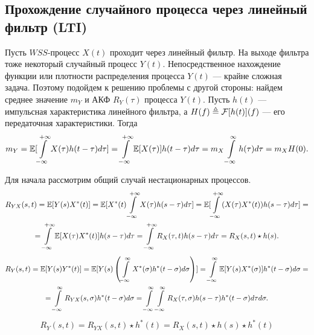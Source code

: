 \documentclass{book}
\numberwithin{theorem}{chapter}
\numberwithin{statement}{chapter}
\numberwithin{lemma}{chapter}
\theoremstyle{definition}
\numberwithin{task}{chapter}
\theoremstyle{remark}
\numberwithin{example}{chapter}
\theoremstyle{definition}
\numberwithin{definition}{chapter}
\theoremstyle{remark}
\theoremstyle{remark}
\numberwithin{lyrics}{section}
\begin{document}
\subsection{Прохождение случайного процесса через линейный фильтр (LTI)}
Пусть $WSS$-процесс $X(t)$ проходит через линейный фильтр. На выходе фильтра тоже некоторый случайный процесс $Y(t)$. Непосредственное нахождение функции или плотности распределения процесса $Y(t)$ --- крайне сложная задача. Поэтому подойдем к решению проблемы с другой стороны: найдем среднее значение $m_Y$ и АКФ $R_Y(\tau)$ процесса $Y(t)$. Пусть $h(t)$ --- импульсная характеристика линейного фильтра, а $H(f) \triangleq \mathcal{F}[h(t)](f)$ --- его передаточная характеристики. Тогда 
\begin{gather}
m_Y = \mathbb{E}[\int\limits_{-\infty}^{+\infty} X(\tau) h(t - \tau) d\tau] = \int\limits_{-\infty}^{+\infty} \mathbb{E}[X(\tau)] h(t - \tau) d\tau = m_X \int\limits_{-\infty}^{\infty} h(\tau) d\tau = m_X H(0).
\end{gather}


Для начала рассмотрим общий случай нестационарных процессов.
\begin{gather*}
R_{YX}(s, t) = \mathbb{E}[Y(s)X^*(t)] = \mathbb{E}[X^*(t)\int\limits_{-\infty}^{+\infty} X(\tau) h(s - \tau) d \tau] = \mathbb{E}[\int\limits_{-\infty}^{+\infty} (X(\tau) X^*(t)) h(s - \tau) d \tau] = \\ = \int\limits_{-\infty}^{+\infty} \mathbb{E}[X(\tau) X^*(t)] h(s - \tau) d \tau = \int\limits_{-\infty}^{+\infty} R_X(\tau, t) h(s - \tau) d \tau = R_X(s, t) \star h(s).
\end{gather*}
\begin{gather*}
R_Y(s, t) = \mathbb{E}[Y(s)Y^*(t)] = \mathbb{E}[Y(s)\left(\int\limits_{-\infty}^{\infty} X^*(\sigma) h^*(t - \sigma)d\sigma\right)] = \int\limits_{-\infty}^{\infty} \mathbb{E}[Y(s)X^*(\sigma)] h^*(t - \sigma)d\sigma = \\ = \int\limits_{-\infty}^{\infty} R_{YX}(s, \sigma) h^*(t - \sigma)d\sigma = \int\limits_{-\infty}^{\infty} \int\limits_{-\infty}^{\infty} R_{X}(\tau, \sigma) h(s - \tau) h^*(t - \sigma) d\tau d\sigma.
\end{gather*}
\begin{gather*}
R_Y(s, t) = R_{YX}(s, t) \star h^*(t) = R_X(s, t) \star h(s) \star h^*(t)
\end{gather*}
\end{document}
